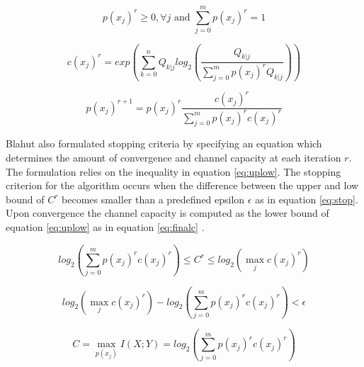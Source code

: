 \documentclass[journal]{IEEEtran}
\begin{document}
\begin{equation}
\label{eq:beginP}
p(x_j)^r \geq 0, \forall j \text{ and } \sum_{j=0}^{m}p(x_j)^r = 1
\end{equation}

\begin{equation}
\label{eq:computec}
c(x_j)^r = exp\left(\sum_{k=0}^{n}Q_{k|j} log_2\left(\frac{Q_{k|j}}{\sum_{j=0}^{m}p(x_j)^rQ_{k|j}}\right)\right)
\end{equation}

\begin{equation}
\label{eq:iter}
p(x_j)^{r+1} = p(x_j)^r\frac{c(x_j)^r}{\sum_{j=0}^{m}p(x_j)^rc(x_j)^r}
\end{equation}

\par Blahut also formulated stopping criteria by specifying an equation which determines the amount of convergence and channel capacity at each iteration \begin{math}r\end{math}. The formulation relies on the inequality in equation \ref{eq:uplow}. The stopping criterion for the algorithm occurs when the difference between the upper and low bound of \begin{math}C^r\end{math} becomes smaller than a predefined epsilon \begin{math}\epsilon\end{math} as in equation \ref{eq:stop}. Upon convergence the channel capacity is computed as the lower bound of equation \ref{eq:uplow} as in equation \ref{eq:finalc} \cite{blahut}.

\begin{equation}
\label{eq:uplow}
log_2\left(\sum_{j = 0}^{m}p(x_j)^rc(x_j)^r\right) \leq C^r \leq log_2(\max_j c(x_j)^r)
\end{equation}

\begin{equation}
\label{eq:stop}
log_2(\max_j c(x_j)^r) - log_2\left(\sum_{j = 0}^{m}p(x_j)^rc(x_j)^r\right) < \epsilon
\end{equation}

\begin{equation}
\label{eq:finalc}
C = \max_{p(x_j)}I(X;Y) = log_2\left(\sum_{j = 0}^{m}p(x_j)^rc(x_j)^r\right)
\end{equation}

\end{document}
